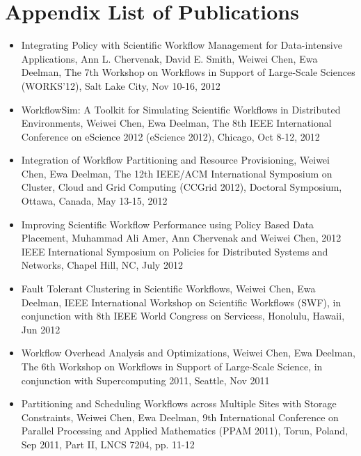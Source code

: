 \chapter*{Appendix\vskip 20pt List of Publications}
\label{ch:listofpublications}


\begin{itemize}
\item Integrating Policy with Scientific Workflow Management for Data-intensive Applications, Ann L. Chervenak, David E. Smith, Weiwei Chen, Ewa Deelman, The 7th Workshop on Workflows in Support of Large-Scale Sciences (WORKS'12), Salt Lake City, Nov 10-16, 2012

\item WorkflowSim: A Toolkit for Simulating Scientific Workflows in Distributed Environments, Weiwei Chen, Ewa Deelman, The 8th IEEE International Conference on eScience 2012 (eScience 2012), Chicago, Oct 8-12, 2012

\item Integration of Workflow Partitioning and Resource Provisioning, Weiwei Chen, Ewa Deelman, The 12th IEEE/ACM International Symposium on Cluster, Cloud and Grid Computing (CCGrid 2012), Doctoral Symposium, Ottawa, Canada, May 13-15, 2012

\item Improving Scientific Workflow Performance using Policy Based Data Placement, Muhammad Ali Amer, Ann Chervenak and Weiwei Chen, 2012 IEEE International Symposium on Policies for Distributed Systems and Networks, Chapel Hill, NC, July 2012
  
\item Fault Tolerant Clustering in Scientific Workflows, Weiwei Chen, Ewa Deelman, IEEE International Workshop on Scientific Workflows (SWF), in conjunction with 8th IEEE World Congress on Servicess, Honolulu, Hawaii, Jun 2012

 \item Workflow Overhead Analysis and Optimizations, Weiwei Chen, Ewa Deelman, The 6th Workshop on Workflows in Support of Large-Scale Science, in conjunction with Supercomputing 2011, Seattle, Nov 2011
 
\item Partitioning and Scheduling Workflows across Multiple Sites with Storage Constraints, Weiwei Chen, Ewa Deelman, 9th International Conference on Parallel Processing and Applied Mathematics (PPAM 2011), Torun, Poland, Sep 2011, Part II, LNCS 7204, pp. 11-12


\end{itemize}
